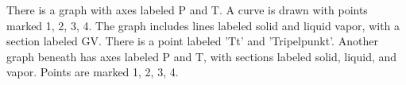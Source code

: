 There is a graph with axes labeled P and T. A curve is drawn with points marked 1, 2, 3, 4. The graph includes lines labeled solid and liquid vapor, with a section labeled GV. There is a point labeled 'Tt' and 'Tripelpunkt'. Another graph beneath has axes labeled P and T, with sections labeled solid, liquid, and vapor. Points are marked 1, 2, 3, 4.